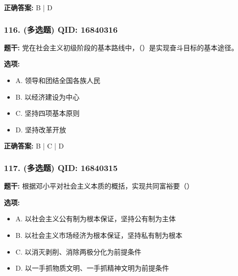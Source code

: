 \documentclass[12pt,UTF8]{ctexart}
\begin{document}
\textbf{正确答案:}
B | D

\vspace{0.3em}\hrulefill\vspace{0.7em}

\subsubsection*{116. (多选题) \small QID: 16840316}

\textbf{题干:}
党在社会主义初级阶段的基本路线中，（）是实现奋斗目标的基本途径。

\textbf{选项:}
\begin{itemize}[leftmargin=*]

  \item A. 领导和团结全国各族人民

  \item B. 以经济建设为中心

  \item C. 坚持四项基本原则

  \item D. 坚持改革开放

\end{itemize}

\textbf{正确答案:}
B | C | D

\vspace{0.3em}\hrulefill\vspace{0.7em}

\subsubsection*{117. (多选题) \small QID: 16840315}

\textbf{题干:}
根据邓小平对社会主义本质的概括，实现共同富裕要（）

\textbf{选项:}
\begin{itemize}[leftmargin=*]

  \item A. 以社会主义公有制为根本保证，坚持公有制为主体

  \item B. 以社会主义市场经济为根本保证，坚持私有制为根本

  \item C. 以消灭剥削、消除两极分化为前提条件

  \item D. 以一手抓物质文明、一手抓精神文明为前提条件

\end{itemize}
\end{document}
